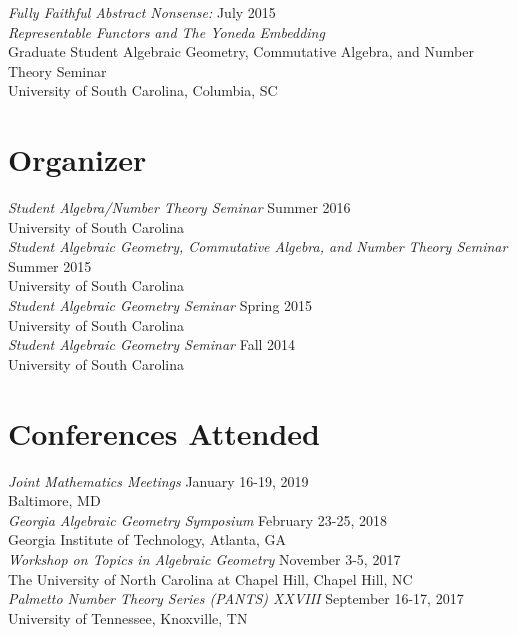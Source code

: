 \documentclass{article}
\begin{document}
\noindent\textsl{Fully Faithful Abstract Nonsense:} \hfill July 2015\\
\textsl{Representable Functors and The Yoneda Embedding}\\
Graduate Student Algebraic Geometry, Commutative Algebra, and Number Theory Seminar\\
University of South Carolina, Columbia, SC

\section*{Organizer}
\textsl{Student Algebra/Number Theory Seminar} \hfill Summer 2016\\
University of South Carolina\\

\noindent\textsl{Student Algebraic Geometry, Commutative Algebra, and Number Theory Seminar} \hfill Summer 2015\\
University of South Carolina\\

\noindent\textsl{Student Algebraic Geometry Seminar} \hfill Spring 2015\\
University of South Carolina\\

\noindent\textsl{Student Algebraic Geometry Seminar} \hfill Fall 2014\\
University of South Carolina

\section*{Conferences Attended}
\textsl{Joint Mathematics Meetings} \hfill January 16-19, 2019\\
Baltimore, MD\\

\noindent\textsl{Georgia Algebraic Geometry Symposium} \hfill February 23-25, 2018\\
Georgia Institute of Technology, Atlanta, GA\\

\noindent\textsl{Workshop on Topics in Algebraic Geometry} \hfill November 3-5, 2017\\
The University of North Carolina at Chapel Hill, Chapel Hill, NC\\

\noindent\textsl{Palmetto Number Theory Series (PANTS) XXVIII} \hfill September 16-17, 2017\\
University of Tennessee, Knoxville, TN\\
\end{document}
